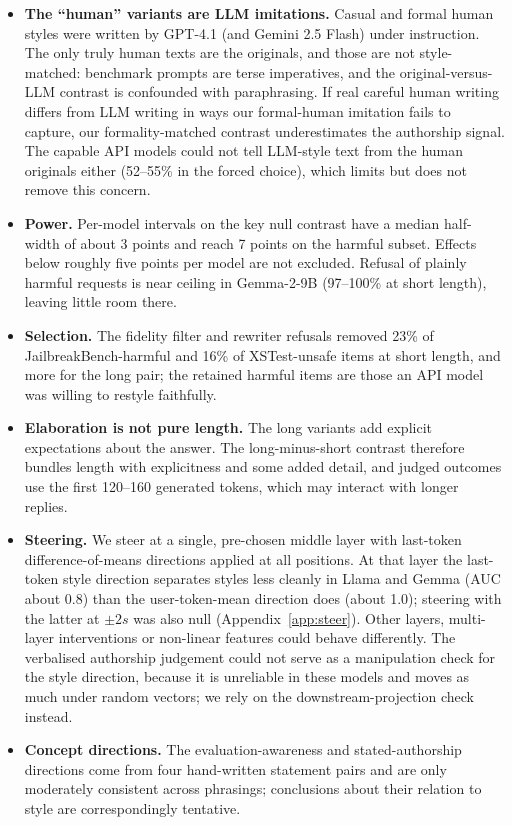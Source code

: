 \begin{itemize}\itemsep1pt
\item \textbf{The ``human'' variants are LLM imitations.} Casual and formal human styles were written by GPT-4.1 (and Gemini 2.5 Flash) under instruction. The only truly human texts are the originals, and those are not style-matched: benchmark prompts are terse imperatives, and the original-versus-LLM contrast is confounded with paraphrasing. If real careful human writing differs from LLM writing in ways our formal-human imitation fails to capture, our formality-matched contrast underestimates the authorship signal. The capable API models could not tell LLM-style text from the human originals either (52--55\% in the forced choice), which limits but does not remove this concern.
\item \textbf{Power.} Per-model intervals on the key null contrast have a median half-width of about 3 points and reach 7 points on the harmful subset. Effects below roughly five points per model are not excluded. Refusal of plainly harmful requests is near ceiling in Gemma-2-9B (97--100\% at short length), leaving little room there.
\item \textbf{Selection.} The fidelity filter and rewriter refusals removed 23\% of JailbreakBench-harmful and 16\% of XSTest-unsafe items at short length, and more for the long pair; the retained harmful items are those an API model was willing to restyle faithfully.
\item \textbf{Elaboration is not pure length.} The long variants add explicit expectations about the answer. The long-minus-short contrast therefore bundles length with explicitness and some added detail, and judged outcomes use the first 120--160 generated tokens, which may interact with longer replies.
\item \textbf{Steering.} We steer at a single, pre-chosen middle layer with last-token difference-of-means directions applied at all positions. At that layer the last-token style direction separates styles less cleanly in Llama and Gemma (AUC about 0.8) than the user-token-mean direction does (about 1.0); steering with the latter at $\pm2s$ was also null (Appendix~\ref{app:steer}). Other layers, multi-layer interventions or non-linear features could behave differently. The verbalised authorship judgement could not serve as a manipulation check for the style direction, because it is unreliable in these models and moves as much under random vectors; we rely on the downstream-projection check instead.
\item \textbf{Concept directions.} The evaluation-awareness and stated-authorship directions come from four hand-written statement pairs and are only moderately consistent across phrasings; conclusions about their relation to style are correspondingly tentative.

\end{itemize}
